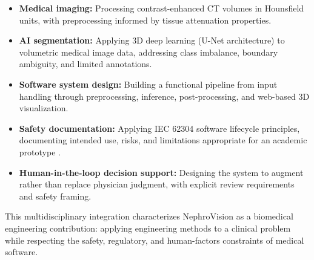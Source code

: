 \begin{itemize}
    \item \textbf{Medical imaging:} Processing contrast-enhanced CT volumes in Hounsfield units, with preprocessing informed by tissue attenuation properties.
    \item \textbf{AI segmentation:} Applying 3D deep learning (U-Net architecture) to volumetric medical image data, addressing class imbalance, boundary ambiguity, and limited annotations.
    \item \textbf{Software system design:} Building a functional pipeline from input handling through preprocessing, inference, post-processing, and web-based 3D visualization.
    \item \textbf{Safety documentation:} Applying IEC 62304 software lifecycle principles, documenting intended use, risks, and limitations appropriate for an academic prototype \cite{iec62304}.
    \item \textbf{Human-in-the-loop decision support:} Designing the system to augment rather than replace physician judgment, with explicit review requirements and safety framing.
\end{itemize}

This multidisciplinary integration characterizes NephroVision as a biomedical engineering contribution: applying engineering methods to a clinical problem while respecting the safety, regulatory, and human-factors constraints of medical software.
